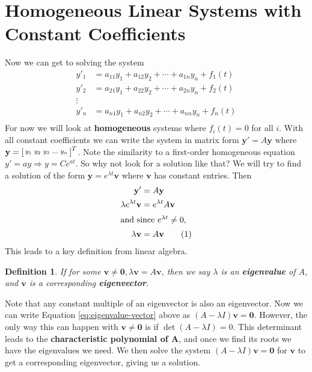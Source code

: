 \documentclass[letterpaper, 11pt, openany]{book}
\theoremstyle{mytheoremstyle}
\newtheorem{definition}{Definition}[section]
\theoremstyle{myexamplestyle}
\newcommand\numberthisline{\addtocounter{equation}{1}\tag{\theequation}}
\begin{document}
\section{Homogeneous Linear Systems with Constant Coefficients}
\setcounter{figure}{0}
Now we can get to solving the system
\begin{align*}
    y'_{1} &= a_{11}y_{1} + a_{12}y_{2} + \cdots + a_{1n} y_{n} + f_{1}(t)\\
    y'_{2} &= a_{21}y_{1} + a_{22}y_{2} + \cdots + a_{2n} y_{n} + f_{2}(t)\\
    \vdots\\
    y'_{n} &= a_{n1}y_{1} + a_{n2}y_{2} + \cdots + a_{nn} y_{n} + f_{n}(t)\\
\end{align*}
For now we will look at \textbf{homogeneous} systems where \(f_{i}(t) = 0\) for all \(i\). With all constant coefficients we can write the system in matrix form \(\mathbf{y}' = A \mathbf{y}\) where \(\mathbf{y} = \begin{bsmallmatrix}
    y_1 & y_2 & y_3 & \hdots &y_n
\end{bsmallmatrix}^{T}\). Note the similarity to a first-order homogeneous equation \(y' = ay \Rightarrow y = Ce^{at}\). So why not look for a solution like that? We will try to find a solution of the form \(\mathbf{y} = e^{\lambda t} \mathbf{v} \) where \(\mathbf{v}\) has constant entries. Then
\begin{align*}
    \mathbf{y}' &= A \mathbf{y}\\
    \lambda e^{\lambda t} \mathbf{v} &= e^{\lambda t} A \mathbf{v}\\
    \intertext{and since \(e^{\lambda t} \neq 0\),}
    \lambda \mathbf{v} &= A \mathbf{v} \numberthisline \label{eq:eigenvalue-vector}
\end{align*}
This leads to a key definition from linear algebra.
\begin{definition}\label{d:eigenvalue-vector}
    If for some \(\mathbf{v} \neq \mathbf{0}, \lambda \mathbf{v} = A \mathbf{v}\), then we say \(\lambda\) is an \textbf{eigenvalue} of \(A\), and \(\mathbf{v}\) is a corresponding \textbf{eigenvector}.
\end{definition}

Note that any constant multiple of an eigenvector is also an eigenvector. Now we can write Equation \ref{eq:eigenvalue-vector} above as \((A - \lambda I) \mathbf{v} = \mathbf{0}\). However, the only way this can happen with \(\mathbf{v} \neq \mathbf{0}\) is if \(\det (A - \lambda I) = 0\). This determinant leads to the \textbf{characteristic polynomial of \(\bm{A}\)}, and once we find its roots we have the eigenvalues we need. We then solve the system \((A - \lambda I) \mathbf{v} = \mathbf{0}\) for \(\mathbf{v}\) to get a corresponding eigenvector, giving us a solution.
\end{document}
